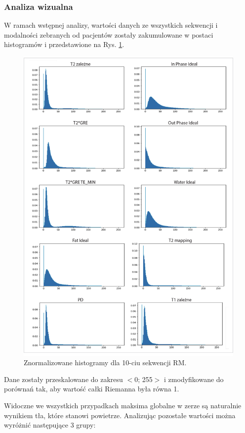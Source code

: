 \subsubsection{Analiza wizualna} W ramach wstępnej analizy, wartości danych ze wszystkich sekwencji i modalności zebranych od pacjentów zostały zakumulowane w postaci  histogramów i przedstawione na Rys. \ref{fig:Hists}.
\begin{figure}[]
	\centering
	\includegraphics[width=1\textwidth]{figures/Hists.jpg}
	\caption{Znormalizowane histogramy dla 10-ciu sekwencji RM.}\label{fig:Hists}
\end{figure}
Dane zostały przeskalowane do zakresu $<$0; 255$>$ i zmodyfikowane do porównań tak, aby wartość całki Riemanna była równa 1.

Widoczne we wszystkich przypadkach maksima globalne w zerze są naturalnie wynikiem tła, które stanowi powietrze. Analizując pozostałe wartości można wyróżnić następujące 3 grupy:

